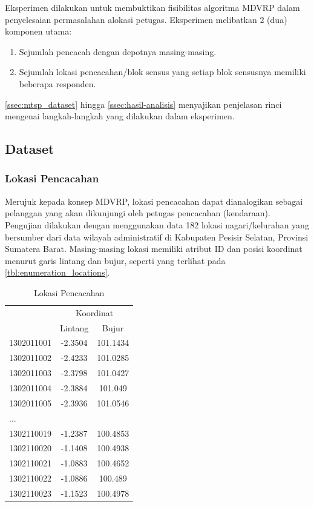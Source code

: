 Eksperimen dilakukan untuk membuktikan fisibilitas algoritma MDVRP dalam penyelesaian permasalahan alokasi petugas. Eksperimen melibatkan 2 (dua) komponen utama:
\begin{enumerate}
	\item Sejumlah pencacah dengan depotnya masing-masing. 
	\item Sejumlah lokasi pencacahan/blok sensus yang setiap blok sensusnya memiliki beberapa responden. 
\end{enumerate}

\autoref{ssec:mtsp_dataset} hingga \autoref{ssec:hasil-analisis} menyajikan penjelasan rinci mengenai langkah-langkah yang dilakukan dalam eksperimen. 

\subsection{Dataset}
\label{ssec:mtsp_dataset}
\subsubsection{Lokasi Pencacahan}
Merujuk kepada konsep MDVRP, lokasi pencacahan dapat dianalogikan sebagai pelanggan yang akan dikunjungi oleh petugas pencacahan (kendaraan). Pengujian dilakukan dengan menggunakan data 182 lokasi nagari/kelurahan yang bersumber dari data wilayah administratif di Kabupaten Pesisir Selatan, Provinsi Sumatera Barat. Masing-masing lokasi memiliki atribut ID dan posisi koordinat menurut garis lintang dan bujur, seperti yang terlihat pada \autoref{tbl:enumeration_locations}.


\begin{table}[!]
	\centering
	\caption{Lokasi Pencacahan}
	\label{tbl:enumeration_locations}
	\begin{tabular}{lcc}
		\toprule
		& \multicolumn{2}{c}{Koordinat}\\
		\cmidrule{2-3}
		& Lintang & Bujur\\ 
		\midrule
		1302011001 & -2.3504 & 101.1434\\ 
		1302011002 & -2.4233 & 101.0285\\ 
		1302011003 & -2.3798 & 101.0427\\ 
		1302011004 & -2.3884 & 101.049\\ 
		1302011005 & -2.3936 & 101.0546\\
		...\\
		1302110019 & -1.2387 & 100.4853\\ 
		1302110020 & -1.1408 & 100.4938\\ 
		1302110021 & -1.0883 & 100.4652\\ 
		1302110022 & -1.0886 & 100.489\\ 
		1302110023 & -1.1523 & 100.4978\\
		\bottomrule
	\end{tabular}
\end{table}


